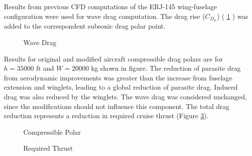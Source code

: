  Results from previous CFD computations of the ERJ-145 wing-fuselage configuration were used for wave drag computation. The drag rise ($C_{D_{w}}$) ( \ref{fig:wavedrag} ) was added to the correspondent subsonic drag polar point.


\begin{figure}[H] %
\caption{Wave Drag}
\label{fig:wavedrag}
\end{figure}

Results for original and modified aircraft compressible drag polars are for $h=35000$ ft and $W=20000$ kg shown in figure. The reduction of parasite drag from aerodynamic improvements was greater than the increase from fuselage extension and winglets, leading to a global reduction of parasite drag. Induced drag was also reduced by the winglets. The wave drag was considered unchanged, since the modifications should not influence this component. The total drag reduction represents a reduction in required cruise thrust (Figure \ref{fig:requiredthrust}).

\begin{figure}[H] %
\caption{Compressible Polar}
\label{fig:compressiblepolar}
\end{figure}

\begin{figure}[H] %
\caption{Required Thrust}
\label{fig:requiredthrust}
\end{figure}
